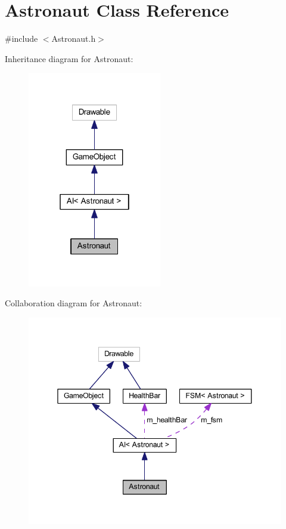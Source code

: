 \hypertarget{class_astronaut}{}\section{Astronaut Class Reference}
\label{class_astronaut}


{\ttfamily \#include $<$Astronaut.\+h$>$}



Inheritance diagram for Astronaut\+:\nopagebreak
\begin{figure}[H]
\begin{center}
\leavevmode
\includegraphics[width=166pt]{class_astronaut__inherit__graph}
\end{center}
\end{figure}


Collaboration diagram for Astronaut\+:\nopagebreak
\begin{figure}[H]
\begin{center}
\leavevmode
\includegraphics[width=345pt]{class_astronaut__coll__graph}
\end{center}
\end{figure}
